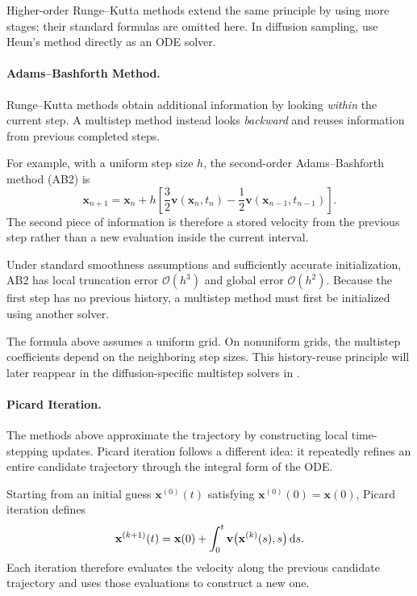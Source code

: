 Higher-order Runge--Kutta methods extend the same principle by using more
stages; their standard formulas are omitted here. In diffusion sampling,
\citet{karras2022elucidating} use Heun's method directly as an ODE solver.


\paragraph{Adams--Bashforth Method.}
Runge--Kutta methods obtain additional information by looking
\emph{within} the current step. A multistep method instead looks
\emph{backward} and reuses information from previous completed steps.

For example, with a uniform step size $h$, the second-order
Adams--Bashforth method (AB2) is
\[
\mathbf{x}_{n+1}
=
\mathbf{x}_n
+
h
\left[
\frac{3}{2}
\mathbf{v}(\mathbf{x}_n,t_n)
-
\frac{1}{2}
\mathbf{v}(\mathbf{x}_{n-1},t_{n-1})
\right].
\]
The second piece of information is therefore a stored velocity from the
previous step rather than a new evaluation inside the current interval.

Under standard smoothness assumptions and sufficiently accurate
initialization, AB2 has local truncation error $\mathcal O(h^3)$ and global
error $\mathcal O(h^2)$. Because the first step has no previous history, a
multistep method must first be initialized using another solver.

The formula above assumes a uniform grid. On nonuniform grids, the
multistep coefficients depend on the neighboring step sizes. This
history-reuse principle will later reappear in the diffusion-specific
multistep solvers in
.


\paragraph{Picard Iteration.}
The methods above approximate the trajectory by constructing local
time-stepping updates. Picard iteration follows a different idea: it
repeatedly refines an entire candidate trajectory through the integral form
of the ODE.

Starting from an initial guess
$\mathbf{x}^{(0)}(t)$ satisfying
$\mathbf{x}^{(0)}(0)=\mathbf{x}(0)$, Picard iteration defines
\[
\mathbf{x}^{(k+1)}(t)
=
\mathbf{x}(0)
+
\int_0^t
\mathbf{v}
\bigl(
\mathbf{x}^{(k)}(s),s
\bigr)
\mathop{}\!\mathrm{d} s.
\]
Each iteration therefore evaluates the velocity along the previous candidate
trajectory and uses those evaluations to construct a new one.

